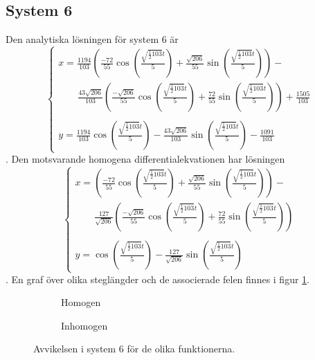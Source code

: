 \subsection{System 6}
Den analytiska lösningen för system 6 är
\begin{equation*}
    \begin{cases}
        x=\frac{1194}{103}(\frac{-72}{55}\cos(\frac{\sqrt{\frac{1}{2}103}t}{5})+\frac{\sqrt{206}}{55}\sin(\frac{\sqrt{\frac{1}{2}103}t}{5}))-\\
        \qquad \frac{43\sqrt{206}}{103}(\frac{-\sqrt{206}}{55}\cos(\frac{\sqrt{\frac{1}{2}103}t}{5})+\frac{72}{55}\sin(\frac{\sqrt{\frac{1}{2}103}t}{5}))+\frac{1505}{103}\\
        \\[-7.5pt]
        y=\frac{1194}{103}\cos({\frac{\sqrt{\frac{1}{2}103}t}{5}})-\frac{43\sqrt{206}}{103}\sin(\frac{\sqrt{\frac{1}{2}103}t}{5})-\frac{1091}{103}
    \end{cases}
\end{equation*}. Den motsvarande homogena differentialekvationen har lösningen 
\begin{equation*}
    \begin{cases}
        x=(\frac{-72}{55}\cos(\frac{\sqrt{\frac{1}{2}103}t}{5})+\frac{\sqrt{206}}{55}\sin(\frac{\sqrt{\frac{1}{2}103}t}{5}))-\\
        \qquad \frac{127}{\sqrt{206}}(\frac{-\sqrt{206}}{55}\cos(\frac{\sqrt{\frac{1}{2}103}t}{5})+\frac{72}{55}\sin(\frac{\sqrt{\frac{1}{2}103}t}{5}))\\
        \\[-7.5pt]
        y=\cos({\frac{\sqrt{\frac{1}{2}103}t}{5}})-\frac{127}{\sqrt{206}}\sin(\frac{\sqrt{\frac{1}{2}103}t}{5})
    \end{cases}
\end{equation*}. En graf över olika steglängder och de associerade felen finnes i figur \ref{fig:diagram_sys_6_errors}.

\begin{figure}[h!]
    \centering

    \begin{subfigure}[h]{\textwidth}
        
        \caption{Homogen}
    \end{subfigure}
    \vspace{1em}\newline
    \begin{subfigure}[h]{\textwidth}
        
        \caption{Inhomogen}
    \end{subfigure}

    \caption{Avvikelsen i system 6 för de olika funktionerna.}
    \label{fig:diagram_sys_6_errors}
\end{figure}

